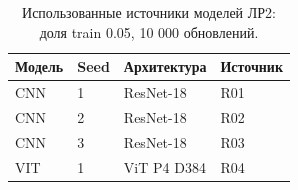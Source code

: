 \begin{table}[H]\centering\small
\setlength{\tabcolsep}{4pt}
\caption{Использованные источники моделей ЛР2: доля train 0.05, 10 000 обновлений.}\label{tab:sources}
\begin{tabular}{ll ll}
\toprule
Модель & Seed & Архитектура & Источник \\
\midrule
CNN & 1 & ResNet-18 & R01 \\
CNN & 2 & ResNet-18 & R02 \\
CNN & 3 & ResNet-18 & R03 \\
VIT & 1 & ViT P4 D384 & R04 \\
\bottomrule
\end{tabular}
\end{table}

